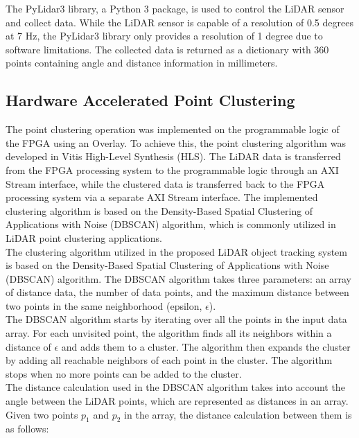 \documentclass[journal]{IEEEtran} %
\begin{document}
The PyLidar3 library, a Python 3 package, is used to control the LiDAR sensor and collect data. While the LiDAR sensor is capable of a resolution of 0.5 degrees at 7 Hz, the PyLidar3 library only provides a resolution of 1 degree due to software limitations. The collected data is returned as a dictionary with 360 points containing angle and distance information in millimeters.


\subsection{Hardware Accelerated Point Clustering}

The point clustering operation was implemented on the programmable logic of the FPGA using an Overlay. To achieve this, the point clustering algorithm was developed in Vitis High-Level Synthesis (HLS). The LiDAR data is transferred from the FPGA processing system to the programmable logic through an AXI Stream interface, while the clustered data is transferred back to the FPGA processing system via a separate AXI Stream interface. The implemented clustering algorithm is based on the Density-Based Spatial Clustering of Applications with Noise (DBSCAN) algorithm, which is commonly utilized in LiDAR point clustering applications.\\

The clustering algorithm utilized in the proposed LiDAR object tracking system is based on the Density-Based Spatial Clustering of Applications with Noise (DBSCAN) algorithm. The DBSCAN algorithm takes three parameters: an array of distance data, the number of data points, and the maximum distance between two points in the same neighborhood (epsilon, $\epsilon$).\\

The DBSCAN algorithm starts by iterating over all the points in the input data array. For each unvisited point, the algorithm finds all its neighbors within a distance of $\epsilon$ and adds them to a cluster. The algorithm then expands the cluster by adding all reachable neighbors of each point in the cluster. The algorithm stops when no more points can be added to the cluster.\\

The distance calculation used in the DBSCAN algorithm takes into account the angle between the LiDAR points, which are represented as distances in an array. Given two points $p_1$ and $p_2$ in the array, the distance calculation between them is as follows:\\
\end{document}
